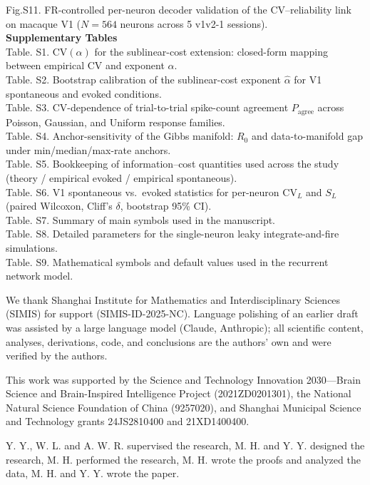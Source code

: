 \documentclass[sn-basic,Numbered]{sn-jnl}%
\theoremstyle{thmstyleone}%
\theoremstyle{thmstyletwo}%
\theoremstyle{thmstylethree}%
\begin{document}
Fig.S11. FR-controlled per-neuron decoder validation of the CV--reliability link on macaque V1 ($N=564$ neurons across 5 v1v2-1 sessions).\\
\textbf{Supplementary Tables}\\
Table. S1. $\mathrm{CV}(\alpha)$ for the sublinear-cost extension: closed-form mapping between empirical CV and exponent $\alpha$.\\
Table. S2. Bootstrap calibration of the sublinear-cost exponent $\hat\alpha$ for V1 spontaneous and evoked conditions.\\
Table. S3. CV-dependence of trial-to-trial spike-count agreement $P_{\mathrm{agree}}$ across Poisson, Gaussian, and Uniform response families.\\
Table. S4. Anchor-sensitivity of the Gibbs manifold: $R_0$ and data-to-manifold gap under min/median/max-rate anchors.\\
Table. S5. Bookkeeping of information--cost quantities used across the study (theory / empirical evoked / empirical spontaneous).\\
Table. S6. V1 spontaneous vs.\ evoked statistics for per-neuron $\mathrm{CV}_L$ and $S_L$ (paired Wilcoxon, Cliff's $\delta$, bootstrap 95\% CI).\\
Table. S7. Summary of main symbols used in the manuscript.\\
Table. S8. Detailed parameters for the single-neuron leaky integrate-and-fire simulations.\\
Table. S9. Mathematical symbols and default values used in the recurrent network model.



We thank Shanghai Institute for Mathematics and Interdisciplinary Sciences (SIMIS) for support (SIMIS-ID-2025-NC).  Language polishing of an earlier draft was assisted by a large language model (Claude, Anthropic); all scientific content, analyses, derivations, code, and conclusions are the authors' own and were verified by the authors.

This work was supported by the Science and Technology Innovation 2030---Brain Science and Brain-Inspired Intelligence Project (2021ZD0201301), the National Natural Science Foundation of China (9257020), and Shanghai Municipal Science and Technology grants 24JS2810400 and 21XD1400400.


Y. Y., W. L. and A. W. R. supervised the research, M. H. and Y. Y. designed the research, M. H. performed the research, M. H. wrote the proofs and analyzed the data, M. H. and Y. Y. wrote the paper.
\end{document}
